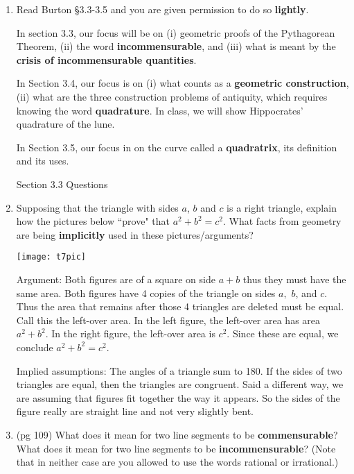 \documentclass[12pt]{article}
\renewcommand{\emph}[1]{\textsf{\textbf{#1}}}
\begin{document}
\begin{enumerate}
\item Read Burton \S 3.3-3.5 and you are given permission to do so \emph{lightly}. 

In section 3.3, our focus will be on (i) geometric proofs of the Pythagorean Theorem, (ii) the word \emph{incommensurable}, and (iii) what is meant by the \emph{crisis of incommensurable quantities}.

In Section 3.4, our focus is on (i) what counts as a \emph{geometric construction}, (ii) what are the three construction problems of antiquity, which requires knowing the word \emph{quadrature}. In class, we will show Hippocrates' quadrature of the lune.

In Section 3.5, our focus in on the curve called a \emph{quadratrix}, its definition and its uses.

\begin{center} Section 3.3 Questions \end{center}

\item Supposing that the triangle with sides $a$, $b$ and $c$ is a right triangle, explain how the pictures below ``prove" that $a^2+b^2=c^2.$ What facts from geometry are being \emph{implicitly} used in these pictures/arguments?

\texttt{[image: t7pic]}

Argument: Both figures are of a square on side $a+b$ thus they must have the same area. Both figures have 4 copies of the triangle on sides $a,$ $b$, and $c$. Thus the area that remains after those 4 triangles are deleted must be equal. Call this the left-over area. In the left figure, the left-over area has area $a^2+b^2$. In the right figure, the left-over area is $c^2.$ Since these are equal, we conclude $a^2+b^2=c^2.$

Implied assumptions: The angles of a triangle sum to 180. If the sides of two triangles are equal, then the triangles are congruent. Said a different way, we are assuming that figures fit together the way it appears. So the sides of the figure really are straight line and not very slightly bent.\\

\item (pg 109) What does it mean for two line segments to be \emph{commensurable}? What does it mean for two line segments to be \emph{incommensurable}? (Note that in neither case are you allowed to use the words rational or irrational.)\\


\end{enumerate}
\end{document}
